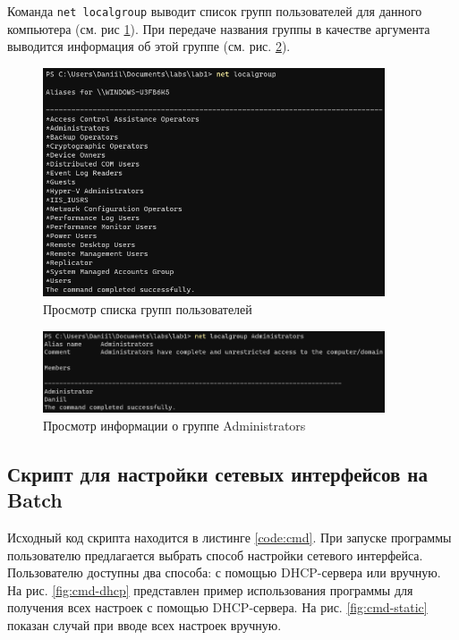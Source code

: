 \documentclass[a4paper, 14pt]{extarticle}
\begin{document}
Команда \texttt{net localgroup} выводит список групп пользователей для данного
компьютера (см. рис \ref{fig:net-localgroup}). При передаче названия группы в
качестве аргумента выводится информация об этой группе (см. рис.
\ref{fig:net-localgroup-administrators}).

\begin{figure}[H]
  \centering
  \includegraphics[width=0.9\textwidth]{images/net/localgroup.png}
  \caption{Просмотр списка групп пользователей}
  \label{fig:net-localgroup}
\end{figure}

\begin{figure}[H]
  \centering
  \includegraphics[width=0.9\textwidth]{images/net/localgroup-administrators.png}
  \caption{Просмотр информации о группе Administrators}
  \label{fig:net-localgroup-administrators}
\end{figure}

\subsection{Скрипт для настройки сетевых интерфейсов на Batch}

Исходный код скрипта находится в листинге \ref{code:cmd}. При запуске программы
пользователю предлагается выбрать способ настройки сетевого интерфейса.
Пользователю доступны два способа: с помощью DHCP-сервера или вручную. На рис.
\ref{fig:cmd-dhcp} представлен пример использования программы для получения
всех настроек с помощью DHCP-сервера. На рис. \ref{fig:cmd-static} показан
случай при вводе всех настроек вручную.
\end{document}
